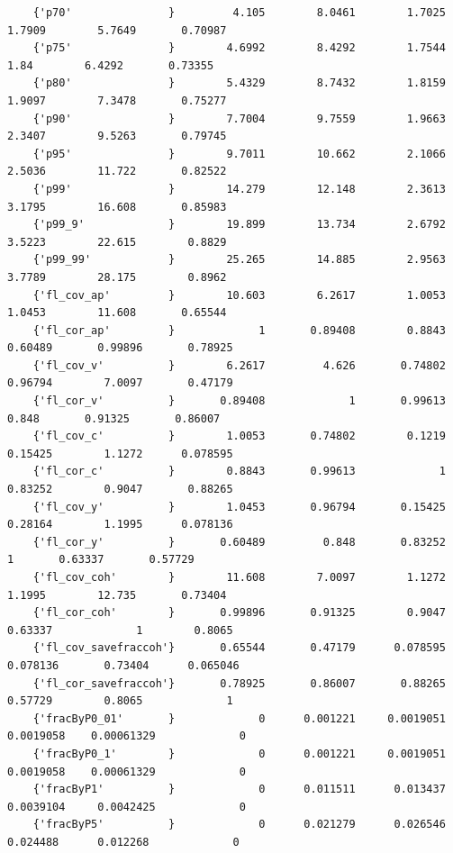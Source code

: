 \documentclass[
]{book}
\begin{document}
\begin{verbatim}
    {'p70'               }         4.105        8.0461        1.7025        1.7909        5.7649       0.70987 
    {'p75'               }        4.6992        8.4292        1.7544          1.84        6.4292       0.73355 
    {'p80'               }        5.4329        8.7432        1.8159        1.9097        7.3478       0.75277 
    {'p90'               }        7.7004        9.7559        1.9663        2.3407        9.5263       0.79745 
    {'p95'               }        9.7011        10.662        2.1066        2.5036        11.722       0.82522 
    {'p99'               }        14.279        12.148        2.3613        3.1795        16.608       0.85983 
    {'p99_9'             }        19.899        13.734        2.6792        3.5223        22.615        0.8829 
    {'p99_99'            }        25.265        14.885        2.9563        3.7789        28.175        0.8962 
    {'fl_cov_ap'         }        10.603        6.2617        1.0053        1.0453        11.608       0.65544 
    {'fl_cor_ap'         }             1       0.89408        0.8843       0.60489       0.99896       0.78925 
    {'fl_cov_v'          }        6.2617         4.626       0.74802       0.96794        7.0097       0.47179 
    {'fl_cor_v'          }       0.89408             1       0.99613         0.848       0.91325       0.86007 
    {'fl_cov_c'          }        1.0053       0.74802        0.1219       0.15425        1.1272      0.078595 
    {'fl_cor_c'          }        0.8843       0.99613             1       0.83252        0.9047       0.88265 
    {'fl_cov_y'          }        1.0453       0.96794       0.15425       0.28164        1.1995      0.078136 
    {'fl_cor_y'          }       0.60489         0.848       0.83252             1       0.63337       0.57729 
    {'fl_cov_coh'        }        11.608        7.0097        1.1272        1.1995        12.735       0.73404 
    {'fl_cor_coh'        }       0.99896       0.91325        0.9047       0.63337             1        0.8065 
    {'fl_cov_savefraccoh'}       0.65544       0.47179      0.078595      0.078136       0.73404      0.065046 
    {'fl_cor_savefraccoh'}       0.78925       0.86007       0.88265       0.57729        0.8065             1 
    {'fracByP0_01'       }             0      0.001221     0.0019051     0.0019058    0.00061329             0 
    {'fracByP0_1'        }             0      0.001221     0.0019051     0.0019058    0.00061329             0 
    {'fracByP1'          }             0      0.011511      0.013437     0.0039104     0.0042425             0 
    {'fracByP5'          }             0      0.021279      0.026546      0.024488      0.012268             0 

\end{verbatim}
\end{document}
